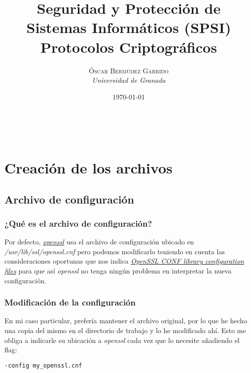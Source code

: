\documentclass[a4paper, 11pt]{article}
\title{\textbf{Seguridad y Protección de Sistemas Informáticos (SPSI)}\\ %
Protocolos Criptográficos} %
\author{\textsc{Óscar Bermúdez Garrido} %
\\{\textit{Universidad de Granada}}} %
\date{\today} %
\makeatletter
\renewcommand{\maketitle}{
  \begin{flushright} %
  
  {\LARGE\@title} %
  
  \vspace{50pt} %
  
  {\large\@author} %
  \\\@date %
  \vspace{40pt} %
  \end{flushright}
}
\makeatother
\begin{document}
\maketitle %

\renewcommand{\abstractname}{Resumen} %

{\parskip=2pt
  \tableofcontents
}
\pagebreak


\section{Creación de los archivos}
	\subsection{Archivo de configuración}
		\subsubsection{¿Qué es el archivo de configuración?}
			Por defecto, \href{http://manpages.ubuntu.com/manpages/zesty/en/man1/openssl.1ssl.html}{\textit{openssl}} usa el
			archivo de configuración ubicado en \textit{/usr/lib/ssl/openssl.cnf} pero podemos modificarlo teniendo en cuenta
			las consideraciones oportunas que nos indica \href{https://www.openssl.org/docs/man1.0.2/apps/config.html}
			{\textit{OpenSSL CONF library configuration files}} para que así \textit{openssl} no tenga ningún problema en
			interpretar la nueva configuración.
			
		\subsubsection{Modificación de la configuración}
			En mi caso particular, prefería mantener el archivo original, por lo que he hecho una copia del mismo en el
			directorio de trabajo y lo he modificado ahí. Esto me obliga a indicarle su ubicación a \textit{openssl} cada
			vez que lo necesite añadiendo el flag:\\
			\begin{small}
				\verb|-config my_openssl.cnf|\\
			\end{small}
		
\end{document}

